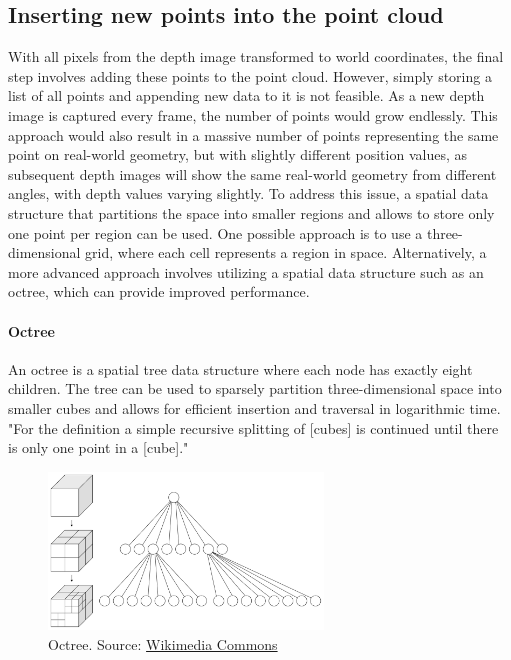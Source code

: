 \subsection{Inserting new points into the point cloud}

With all pixels from the depth image transformed to world coordinates, the final step involves adding these points to the point cloud.
However, simply storing a list of all points and appending new data to it is not feasible.
As a new depth image is captured every frame, the number of points would grow endlessly.
This approach would also result in a massive number of points representing the same point on real-world geometry,
but with slightly different position values,
as subsequent depth images will show the same real-world geometry from different angles, with depth values varying slightly.
To address this issue, a spatial data structure that partitions the space into smaller regions and
allows to store only one point per region can be used.
One possible approach is to use a three-dimensional grid, where each cell represents a region in space.
Alternatively, a more advanced approach involves utilizing a spatial data structure such as an octree,
which can provide improved performance.

\paragraph{Octree}
An octree is a spatial tree data structure where each node has exactly eight children.
The tree can be used to sparsely partition three-dimensional space into smaller cubes and allows for efficient
insertion and traversal in logarithmic time.
"For the definition a simple recursive splitting of [cubes] is continued until there is only one point in a [cube]."
\parencite{gabriel_zachmann_geometric_2002}

\begin{figure}[h]
    \centering
    \includegraphics[width=0.65\textwidth]{images/octree}
    \caption{Octree. Source: \href{https://commons.wikimedia.org/wiki/File:Octree2.svg}{Wikimedia Commons}}
    \label{fig:octrree}
\end{figure}

